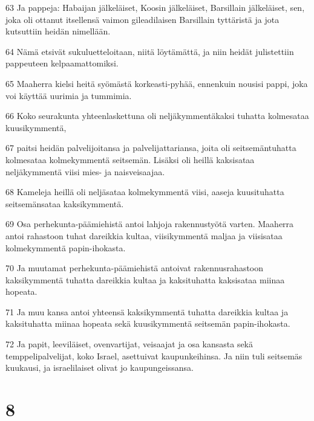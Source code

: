 \par 63 Ja pappeja: Habaijan jälkeläiset, Koosin jälkeläiset, Barsillain jälkeläiset, sen, joka oli ottanut itsellensä vaimon gileadilaisen Barsillain tyttäristä ja jota kutsuttiin heidän nimellään.
\par 64 Nämä etsivät sukuluetteloitaan, niitä löytämättä, ja niin heidät julistettiin pappeuteen kelpaamattomiksi.
\par 65 Maaherra kielsi heitä syömästä korkeasti-pyhää, ennenkuin nousisi pappi, joka voi käyttää uurimia ja tummimia.
\par 66 Koko seurakunta yhteenlaskettuna oli neljäkymmentäkaksi tuhatta kolmesataa kuusikymmentä,
\par 67 paitsi heidän palvelijoitansa ja palvelijattariansa, joita oli seitsemäntuhatta kolmesataa kolmekymmentä seitsemän. Lisäksi oli heillä kaksisataa neljäkymmentä viisi mies- ja naisveisaajaa.
\par 68 Kameleja heillä oli neljäsataa kolmekymmentä viisi, aaseja kuusituhatta seitsemänsataa kaksikymmentä.
\par 69 Osa perhekunta-päämiehistä antoi lahjoja rakennustyötä varten. Maaherra antoi rahastoon tuhat dareikkia kultaa, viisikymmentä maljaa ja viisisataa kolmekymmentä papin-ihokasta.
\par 70 Ja muutamat perhekunta-päämiehistä antoivat rakennusrahastoon kaksikymmentä tuhatta dareikkia kultaa ja kaksituhatta kaksisataa miinaa hopeata.
\par 71 Ja muu kansa antoi yhteensä kaksikymmentä tuhatta dareikkia kultaa ja kaksituhatta miinaa hopeata sekä kuusikymmentä seitsemän papin-ihokasta.
\par 72 Ja papit, leeviläiset, ovenvartijat, veisaajat ja osa kansasta sekä temppelipalvelijat, koko Israel, asettuivat kaupunkeihinsa. Ja niin tuli seitsemäs kuukausi, ja israelilaiset olivat jo kaupungeissansa.

\chapter{8}

